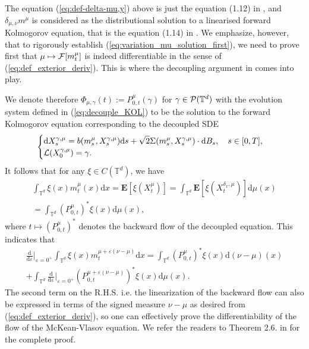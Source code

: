 \begin{rem}
The equation (\ref{eq:def-delta-mu,y}) above is just the equation (1.12) in \cite{T21}, and $\delta_{\mu,\nu} m^{\mu}$ is considered as the distributional solution to a linearised forward Kolmogorov equation, that is the equation (1.14) in \cite{T21}. We emphasize, however, that to rigorously establish (\ref{eq:variation_mu_solution_first}), we need to prove first that $\mu \mapsto \mathcal{F}[m_t^{\mu}]$ is indeed differentiable in the sense of (\ref{eq:def_exterior_deriv}). This is where the decoupling argument in \cite{BLPC17} comes into play. 

We denote therefore $\Phi_{\mu,\gamma}(t) := P^{\mu}_{0,t} (\gamma)$ for $\gamma \in \mathcal{P}(\mathbb{T}^d)$ with the evolution system defined in (\ref{eq:decouple_KOL}) to be the solution to the forward Kolmogorov equation corresponding to the decoupled SDE
\begin{equation}\label{eq:SDE_decouple}
\begin{cases}\displaystyle
\mathrm{d}X^{\gamma,\mu}_s = b(m^{\mu}_s,X^{\gamma,\mu}_s)\mathrm{d}s + \sqrt{2}\Sigma(m^{\mu}_s, X^{\gamma,\mu}_s) \cdot \mathrm{d}B_s, \quad s \in [0,T],\\
\mathcal{L}(X^{\gamma,\mu}_0) = \gamma.
\end{cases}
\end{equation} 
It follows that for any $\xi \in C(\mathbb{T}^d)$, we have
\begin{align*}
    \int_{\mathbb{T}^d}\xi(x) m_t^{\mu}(x)\mathrm{d}x = \mathbf{E}[\xi(X^{\mu}_t)]=\int_{\mathbb{T}^d} \mathbf{E}[\xi(X^{\delta_x,\mu}_t)]\mathrm{d}\mu(x)\\=\int_{\mathbb{T}^d} (P^{\mu}_{0,t})^{\ast}\xi(x)\mathrm{d}\mu(x),
\end{align*}
where $t \mapsto (P^{\mu}_{0,t})^{\ast}$ denotes the backward flow of the decoupled equation. This indicates that 
\begin{equation}\label{eq:linearization-xi-m-mu}
    \begin{split}
    \frac{\mathrm{d}}{\mathrm{d}\varepsilon}\Big|_{\varepsilon = 0^+}\int_{\mathbb{T}^d}\xi(x) m_t^{\mu+\varepsilon(\nu - \mu)}\mathrm{d}x 
    =\int_{\mathbb{T}^d} (P^{\mu}_{0,t})^{\ast}\xi(x)\mathrm{d}(\nu - \mu)(x)\\
    + \int_{\mathbb{T}^d} \frac{\mathrm{d}}{\mathrm{d\varepsilon}}\Big|_{\varepsilon = 0^+}(P^{\mu+\varepsilon(\nu - \mu)}_{0,t})^{\ast}\xi(x)\mathrm{d}\mu(x).
    \end{split}
\end{equation}
The second term on the R.H.S. i.e. the linearization of the backward flow can also be expressed in terms of the signed measure $\nu - \mu$ as desired from (\ref{eq:def_exterior_deriv}), so one can effectively prove the differentiability of the flow of the McKean-Vlasov equation. We refer the readers to Theorem 2.6. in \cite{T21} for the complete proof. 
\end{rem}

